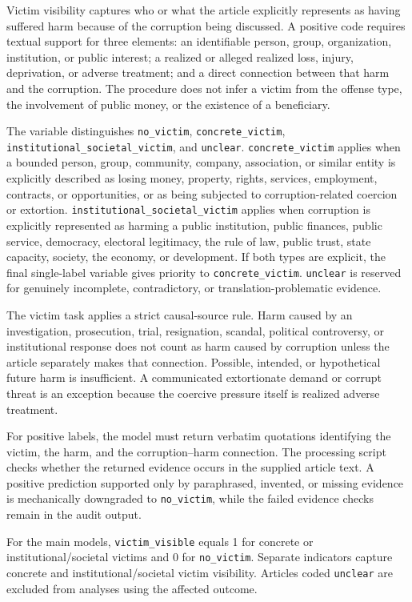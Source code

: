Victim visibility captures who or what the article explicitly represents as
having suffered harm because of the corruption being discussed. A positive
code requires textual support for three elements: an identifiable person,
group, organization, institution, or public interest; a realized or alleged
realized loss, injury, deprivation, or adverse treatment; and a direct
connection between that harm and the corruption. The procedure does not infer a
victim from the offense type, the involvement of public money, or the existence
of a beneficiary.

The variable distinguishes \nolinkurl{no_victim},
\nolinkurl{concrete_victim},
\texttt{institutional\_}\allowbreak\texttt{societal\_victim}, and
\nolinkurl{unclear}.
\nolinkurl{concrete_victim} applies when a bounded person, group, community,
company, association, or similar entity is explicitly described as losing
money, property, rights, services, employment, contracts, or opportunities, or
as being subjected to corruption-related coercion or extortion.
\texttt{institutional\_}\allowbreak\texttt{societal\_victim} applies when
corruption is explicitly represented as harming a public institution, public finances, public service,
democracy, electoral legitimacy, the rule of law, public trust, state capacity,
society, the economy, or development. If both types are explicit, the final
single-label variable gives priority to \nolinkurl{concrete_victim}.
\nolinkurl{unclear} is reserved for genuinely incomplete, contradictory, or
translation-problematic evidence.

The victim task applies a strict causal-source rule. Harm caused by an
investigation, prosecution, trial, resignation, scandal, political controversy,
or institutional response does not count as harm caused by corruption unless
the article separately makes that connection. Possible, intended, or
hypothetical future harm is insufficient. A communicated extortionate demand
or corrupt threat is an exception because the coercive pressure itself is
realized adverse treatment.

For positive labels, the model must return verbatim quotations identifying the
victim, the harm, and the corruption--harm connection. The processing script
checks whether the returned evidence occurs in the supplied article text. A
positive prediction supported only by paraphrased, invented, or missing
evidence is mechanically downgraded to \nolinkurl{no_victim}, while the failed
evidence checks remain in the audit output.

For the main models, \nolinkurl{victim_visible} equals 1 for concrete or
institutional/societal victims and 0 for \nolinkurl{no_victim}. Separate
indicators capture concrete and institutional/societal victim visibility.
Articles coded \nolinkurl{unclear} are excluded from analyses using the affected
outcome.

